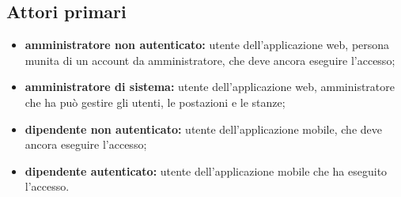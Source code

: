 \subsection{Attori primari}
\begin{itemize}
    \item \textbf{amministratore non autenticato:} utente dell'applicazione web, persona munita di un account da amministratore, che deve ancora eseguire l'accesso;
    \item \textbf{amministratore di sistema:} utente dell'applicazione web, amministratore che ha pu\`{o} gestire gli utenti, le postazioni e le stanze;
    \item \textbf{dipendente non autenticato:} utente dell'applicazione mobile, che deve ancora eseguire l'accesso;
    \item \textbf{dipendente autenticato:} utente dell'applicazione mobile che ha eseguito l'accesso.
\end{itemize}
